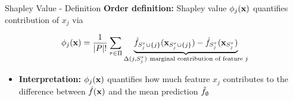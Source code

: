 \documentclass[10pt,compress,t,notes=noshow, xcolor=table]{beamer}
\newcommand{\Stau}{S_{j}^\tau}%
\newcommand{\Stauj}{\Stau \cup \{j\}}
\begin{document}



\begin{frame}{Shapley Value - Definition  }
  \textbf{Order definition:} Shapley value $\phi_j(\mathbf{x})$ quantifies contribution of $x_j$ via

     $$ \phi_j(\xv)  = \frac{1}{|P|!} \sum_{\tau \in \Pi} \underbrace{\fh_{\Stauj}(\xv_{\Stauj}) - \fh_{\Stau}(\xv_{\Stau})}_{\Delta(j, \Stau)~\text{marginal contribution of feature $j$}} $$ %
     
     
\begin{itemize}
  \item \textbf{Interpretation:}  $\phi_j(\mathbf{x})$ quantifies how much feature $x_j$ contributes to the difference between $\hat{f}(\mathbf{x})$ and the mean prediction $\hat{f}_\emptyset$


\end{itemize}
\end{frame}
\end{document}
